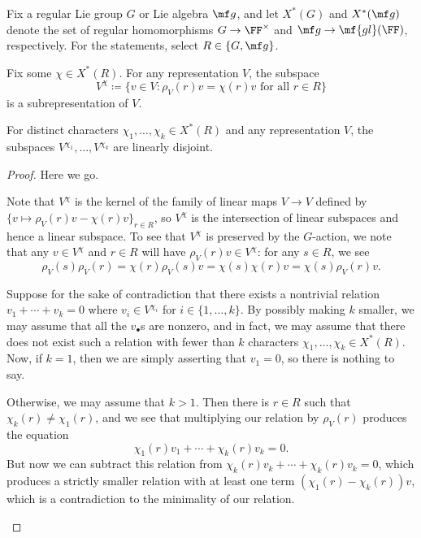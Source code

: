 \documentclass[../notes.tex]{subfiles}
\begin{document}
\begin{lemma} \label{lem:weight-decomposition}
	Fix a regular Lie group $G$ or Lie algebra $\mf g$, and let $X^*(G)$ and $X^*(\mf g)$ denote the set of regular homomorphisms $G\to\FF^\times$ and $\mf g\to\mf{gl}(\FF)$, respectively. For the statements, select $R\in\{G,\mf g\}$.
	\begin{listalph}
		\item Fix some $\chi\in X^*(R)$. For any representation $V$, the subspace
		\[V^\chi\coloneqq\{v\in V:\rho_V(r)v=\chi(r)v\text{ for all }r\in R\}\]
		is a subrepresentation of $V$.
		\item For distinct characters $\chi_1,\ldots,\chi_k\in X^*(R)$ and any representation $V$, the subspaces $V^{\chi_1},\ldots,V^{\chi_k}$ are linearly disjoint.
	\end{listalph}
\end{lemma}
\begin{proof}
	Here we go.
	\begin{listalph}
		\item Note that $V^\chi$ is the kernel of the family of linear maps $V\to V$ defined by $\{v\mapsto\rho_V(r)v-\chi(r)v\}_{r\in R}$, so $V^\chi$ is the intersection of linear subspaces and hence a linear subspace. To see that $V^\chi$ is preserved by the $G$-action, we note that any $v\in V^\chi$ and $r\in R$ will have $\rho_V(r)v\in V^\chi$: for any $s\in R$, we see
		\[\rho_V(s)\rho_V(r)=\chi(r)\rho_V(s)v=\chi(s)\chi(r)v=\chi(s)\rho_V(r)v.\]

		\item Suppose for the sake of contradiction that there exists a nontrivial relation $v_1+\cdots+v_k=0$ where $v_i\in V^{\chi_i}$ for $i\in\{1,\ldots,k\}$. By possibly making $k$ smaller, we may assume that all the $v_\bullet$s are nonzero, and in fact, we may assume that there does not exist such a relation with fewer than $k$ characters $\chi_1,\ldots,\chi_k\in X^*(R)$. Now, if $k=1$, then we are simply asserting that $v_1=0$, so there is nothing to say.

		Otherwise, we may assume that $k>1$. Then there is $r\in R$ such that $\chi_k(r)\ne\chi_1(r)$, and we see that multiplying our relation by $\rho_V(r)$ produces the equation
		\[\chi_1(r)v_1+\cdots+\chi_k(r)v_k=0.\]
		But now we can subtract this relation from $\chi_k(r)v_k+\cdots+\chi_k(r)v_k=0$, which produces a strictly smaller relation with at least one term $(\chi_1(r)-\chi_k(r))v$, which is a contradiction to the minimality of our relation.
		\qedhere
	\end{listalph}
\end{proof}
\end{document}
